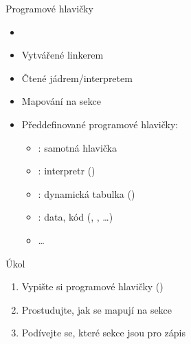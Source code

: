 
\begin{frame}{Programové hlavičky}

  \begin{itemize}
    \item {}
    \item Vytvářené linkerem
    \item Čtené jádrem/interpretem
    \item Mapování na sekce

    \pause

    \item Předdefinované programové hlavičky:
    \begin{itemize}
      \item {}: samotná hlavička
      \item {}: interpretr ()
      \item {}: dynamická tabulka ()
      \item {}: data, kód (, , \dots)
      \item \dots
    \end{itemize}
  \end{itemize}

\end{frame}

\begin{frame}{Úkol}

  \begin{enumerate}
    \item Vypište si programové hlavičky ()
    \item Prostudujte, jak se mapují na sekce
    \item Podívejte se, které sekce jsou pro zápis
  \end{enumerate}

\end{frame}


